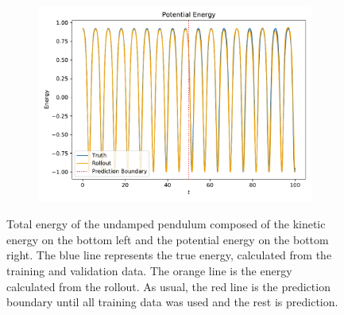 \begin{figure}
\begin{subfigure}{0.5\linewidth}
				\includegraphics[width=\linewidth]{figures/results/pendulum/run-latent-dim-10/energy-R10-N0-potential.pdf}
			\end{subfigure}
			\caption{Total energy of the undamped pendulum composed of the kinetic energy on the bottom left and the potential energy on the bottom right. The blue line represents the true energy, calculated from the training and validation data. The orange line is the energy calculated from the rollout. As usual, the red line is the prediction boundary until all training data was used and the rest is prediction.}
		\end{figure}

